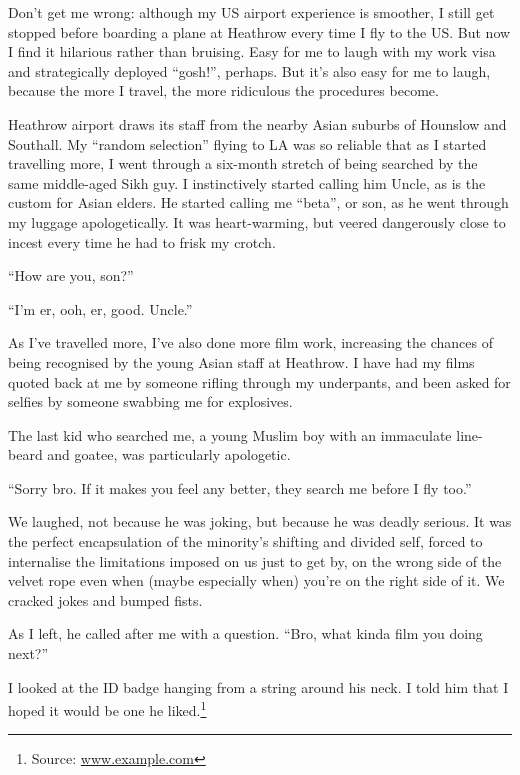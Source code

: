 \documentclass[10pt,a4paper]{article}
\newcommand{\source}[1]{\footnote{Source: \href{#1}{#1}}}
\begin{document}
Don’t get me wrong: although my US airport experience is smoother, I still get stopped before boarding a plane at Heathrow every time I fly to the US. But now I find it hilarious rather than bruising. Easy for me to laugh with my work visa and strategically deployed “gosh!”, perhaps. But it’s also easy for me to laugh, because the more I travel, the more ridiculous the procedures become.

Heathrow airport draws its staff from the nearby Asian suburbs of Hounslow and Southall. My “random selection” flying to LA was so reliable that as I started travelling more, I went through a six-month stretch of being searched by the same middle-aged Sikh guy. I instinctively started calling him Uncle, as is the custom for Asian elders. He started calling me “beta”, or son, as he went through my luggage apologetically. It was heart-warming, but veered dangerously close to incest every time he had to frisk my crotch.

“How are you, son?”

“I’m er, ooh, er, good. Uncle.”

As I’ve travelled more, I’ve also done more film work, increasing the chances of being recognised by the young Asian staff at Heathrow. I have had my films quoted back at me by someone rifling through my underpants, and been asked for selfies by someone swabbing me for explosives.

The last kid who searched me, a young Muslim boy with an immaculate line-beard and goatee, was particularly apologetic.

“Sorry bro. If it makes you feel any better, they search me before I fly too.”

We laughed, not because he was joking, but because he was deadly serious. It was the perfect encapsulation of the minority’s shifting and divided self, forced to internalise the limitations imposed on us just to get by, on the wrong side of the velvet rope even when (maybe especially when) you’re on the right side of it. We cracked jokes and bumped fists.

As I left, he called after me with a question. “Bro, what kinda film you doing next?”

I looked at the ID badge hanging from a string around his neck. I told him that I hoped it would be one he liked.\source{www.example.com}
\end{document}
